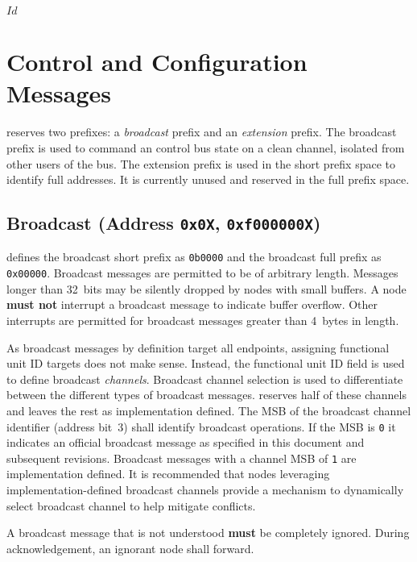 \svnInfo $Id$

\section{Control and Configuration Messages}
\label{sec:control}

\bus reserves two prefixes: a {\em broadcast} prefix and an {\em extension}
prefix. The broadcast prefix is used to command an control bus state on a
clean channel, isolated from other users of the bus. The extension prefix is
used in the short prefix space to identify full addresses. It is currently
unused and reserved in the full prefix space.

\subsection{Broadcast (Address \texttt{0x0X}, \texttt{0xf000000X})}
\label{sec:control-broadcast}
\bus defines the broadcast short prefix as {\tt 0b0000} and the broadcast full
prefix as {\tt 0x00000}. Broadcast messages
are permitted to be of arbitrary length. Messages longer than 32~bits may be
silently dropped by nodes with small buffers. A node \textbf{must not}
interrupt a broadcast message to indicate buffer overflow. Other interrupts
are permitted for broadcast messages greater than 4~bytes in length.

As broadcast messages by definition target all endpoints, assigning functional
unit ID targets does not make sense. Instead, the functional unit ID field is
used to define broadcast {\em channels}. Broadcast channel selection is used
to differentiate between the different types of broadcast messages. \bus
reserves half of these channels and leaves the rest as implementation defined.
%
The MSB of the broadcast channel identifier (address bit~3) shall identify
\bus broadcast operations. If the MSB is {\tt 0} it indicates an official \bus
broadcast message as specified in this document and subsequent revisions.
Broadcast messages with a channel MSB of {\tt 1} are implementation defined.
It is recommended that nodes leveraging implementation-defined broadcast
channels provide a mechanism to dynamically select broadcast channel to help
mitigate conflicts.

A broadcast message that is not understood \textbf{must} be completely
ignored. During acknowledgement, an ignorant node shall forward.

